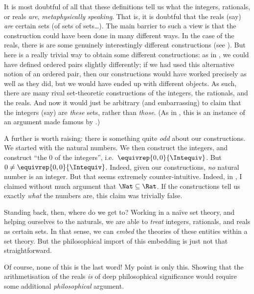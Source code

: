 \documentclass[../../../include/open-logic-section]{subfiles}
\begin{document}
It is most doubtful of all that these definitions tell us what the integers, rationals, or reals \emph{are}, \emph{metaphysically speaking}. That is, it is doubtful that the reals (say) \emph{are} certain sets (of sets of sets\ldots). The main barrier to such a view is that the construction could have been done in many different ways. In the case of the reals, there is are some genuinely interestingly different constructions (see ). But here is a really trivial way to obtain some different constructions: as in , we could have defined ordered pairs slightly differently; if we had used this alternative notion of an ordered pair, then our constructions would have worked precisely as well as they did, but we would have ended up with different objects. As such, there are many rival set-theoretic constructions of the integers, the rationals, and the reals. And now it would just be arbitrary (and embarrassing) to claim that the integers (say) are \emph{these} sets, rather than \emph{those}. (As in , this is an instance of an argument made famous by \citealt{Benacerraf1965}.)

A further is worth raising: there is something quite \emph{odd} about our constructions. We started with the natural numbers. We then construct the integers, and construct ``the $0$ of the integers'', i.e.\ $ \equivrep{0,0}{\Intequiv}$. But $0 \neq \equivrep{0,0}{\Intequiv}$. Indeed,  given our constructions, \emph{no} natural number is an integer. But that seems extremely counter-intuitive. Indeed, in , I claimed without much argument that $\Nat \subseteq \Rat$. If the constructions tell us exactly \emph{what} the numbers are, this claim was trivially false. 

Standing back, then, where do we get to? Working in a na\"ive set theory, and helping ourselves to the naturals, we are able to \emph{treat} integers, rationals, and reals as certain sets. In that sense, we can \emph{embed} the theories of these entities within a set theory. But the philosophical import of this embedding is just not that straightforward. 

Of course, none of this is the last word!{} My point is only this. Showing that the arithmetisation of the reals \emph{is} of deep philosophical significance would require some additional \emph{philosophical} argument.

\end{document}
